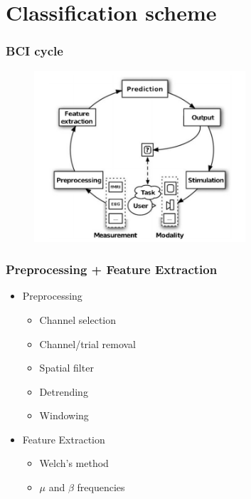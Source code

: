 \documentclass{beamer}
\begin{document}
\section{Classification scheme}

\begin{frame}
  \frametitle{BCI cycle}
  \begin{figure}
    \centering
    \includegraphics[width=0.7\textwidth]{bci_cycle.png}
  \end{figure}
 
\end{frame}

\begin{frame}
  \frametitle{Preprocessing + Feature Extraction}

  \begin{itemize}
    \item Preprocessing 
	\begin{itemize}
		\item Channel selection
		\item Channel/trial removal
		\item Spatial filter
		\item Detrending
		\item Windowing
	\end{itemize}
    \item Feature Extraction
	\begin{itemize}
		\item Welch's method
		\item $\mu$ and $\beta$ frequencies
	\end{itemize}
  \end{itemize}

   

\end{frame}
\end{document}

